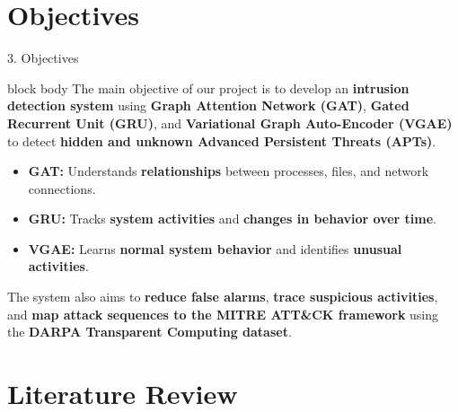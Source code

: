 \documentclass[aspectratio=169,10pt]{beamer}
\begin{document}
\section{Objectives}

\begin{frame}{3. Objectives}
\vspace{0.45em}
\begin{beamercolorbox}[rounded=true,shadow=false,sep=0.75em,wd=\textwidth]{block body}
\fontsize{8.8pt}{13.8pt}\selectfont
The main objective of our project is to develop an \textbf{intrusion detection system} using \textbf{Graph Attention Network (GAT)}, \textbf{Gated Recurrent Unit (GRU)}, and \textbf{Variational Graph Auto-Encoder (VGAE)} to detect \textbf{hidden and unknown Advanced Persistent Threats (APTs)}.

\vspace{0.3em}
\begin{itemize}\itemsep0.20em
  \item \textbf{GAT:} Understands \textbf{relationships} between processes, files, and network connections.
  \item \textbf{GRU:} Tracks \textbf{system activities} and \textbf{changes in behavior over time}.
  \item \textbf{VGAE:} Learns \textbf{normal system behavior} and identifies \textbf{unusual activities}.
\end{itemize}

\vspace{0.3em}
The system also aims to \textbf{reduce false alarms}, \textbf{trace suspicious activities}, and \textbf{map attack sequences to the MITRE ATT\&CK framework} using the \textbf{DARPA Transparent Computing dataset}.
\end{beamercolorbox}
\end{frame}

\section{Literature Review}
\end{document}
